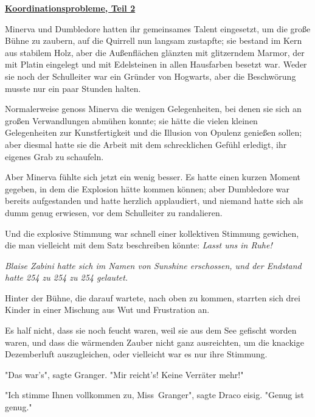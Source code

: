 

\hypertarget{koordinationsprobleme-teil-2}{%

\textbf{\uline{Koordinationsprobleme, Teil 2}}

Minerva und Dumbledore hatten ihr gemeinsames Talent eingesetzt, um die große Bühne zu zaubern, auf die Quirrell nun langsam zustapfte; sie bestand im Kern aus stabilem Holz, aber die Außenflächen glänzten mit glitzerndem Marmor, der mit Platin eingelegt und mit Edelsteinen in allen Hausfarben besetzt war. Weder sie noch der Schulleiter war ein Gründer von Hogwarts, aber die Beschwörung musste nur ein paar Stunden halten.

Normalerweise genoss Minerva die wenigen Gelegenheiten, bei denen sie sich an großen Verwandlungen abmühen konnte; sie hätte die vielen kleinen Gelegenheiten zur Kunstfertigkeit und die Illusion von Opulenz genießen sollen; aber diesmal hatte sie die Arbeit mit dem schrecklichen Gefühl erledigt, ihr eigenes Grab zu schaufeln.

Aber Minerva fühlte sich jetzt ein wenig besser. Es hatte einen kurzen Moment gegeben, in dem die Explosion hätte kommen können; aber Dumbledore war bereits aufgestanden und hatte herzlich applaudiert, und niemand hatte sich als dumm genug erwiesen, vor dem Schulleiter zu randalieren.

Und die explosive Stimmung war schnell einer kollektiven Stimmung gewichen, die man vielleicht mit dem Satz beschreiben könnte: \emph{Lasst uns in Ruhe!}

\emph{Blaise Zabini hatte sich im Namen von Sunshine erschossen, und der Endstand hatte 254 zu 254 zu 254 gelautet.}

Hinter der Bühne, die darauf wartete, nach oben zu kommen, starrten sich drei Kinder in einer Mischung aus Wut und Frustration an.

Es half nicht, dass sie noch feucht waren, weil sie aus dem See gefischt worden waren, und dass die wärmenden Zauber nicht ganz ausreichten, um die knackige Dezemberluft auszugleichen, oder vielleicht war es nur ihre Stimmung.

"Das war's", sagte Granger. "Mir reicht's! Keine Verräter mehr!"

"Ich stimme Ihnen vollkommen zu, Miss~Granger", sagte Draco eisig. "Genug ist genug."

}
